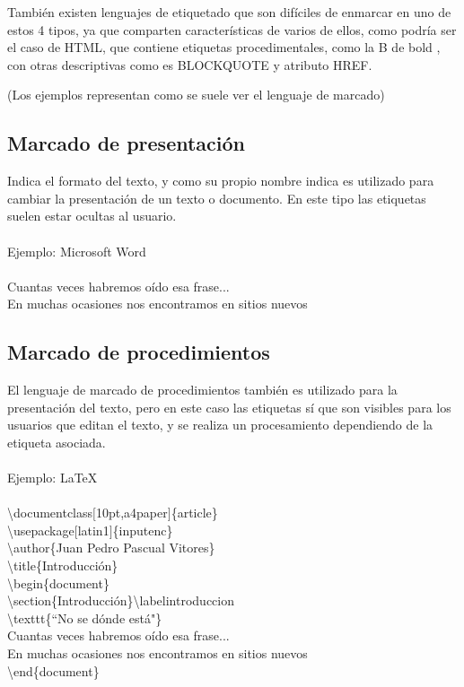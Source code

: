 También existen lenguajes de etiquetado que son difíciles de enmarcar en uno de estos 4 tipos, ya que comparten características de varios de ellos, como podría ser el caso de HTML, que contiene etiquetas procedimentales, como la B de bold , con otras descriptivas como es BLOCKQUOTE y atributo HREF.


(Los ejemplos representan como se suele ver el lenguaje de marcado)

\subsection{Marcado de presentación}\label{marcado-presentacion}

Indica el formato del texto, y como su propio nombre indica es utilizado para cambiar la presentación de un texto o documento. En este tipo las etiquetas suelen estar ocultas al usuario.
\\
\\
Ejemplo: Microsoft Word
\\
\\
Cuantas veces habremos oído esa frase...
\\
En muchas ocasiones nos encontramos en sitios nuevos

\subsection{Marcado de procedimientos}\label{marcado-procedimientos}

El lenguaje de marcado de procedimientos también es utilizado para la presentación del texto, pero en este caso las etiquetas sí que son visibles para los usuarios que editan el texto, y se realiza un procesamiento dependiendo de la etiqueta asociada.
\\
\\
Ejemplo: LaTeX
\\
\\
\textbackslash documentclass$[$10pt,a4paper$]$\{article\}
\\
\textbackslash usepackage$[$latin1$]$\{inputenc\}
\\
\textbackslash author\{Juan Pedro Pascual Vitores\}
\\
\textbackslash title\{Introducción\}
\\
\textbackslash begin\{document\}
\\
\textbackslash section\{Introducción\}\textbackslash label{introduccion}
\\
\textbackslash texttt\{``No se dónde está"\}
\\
Cuantas veces habremos oído esa frase...
\\
En muchas ocasiones nos encontramos en sitios nuevos
\\
\textbackslash end\{document\}
\\
\\

